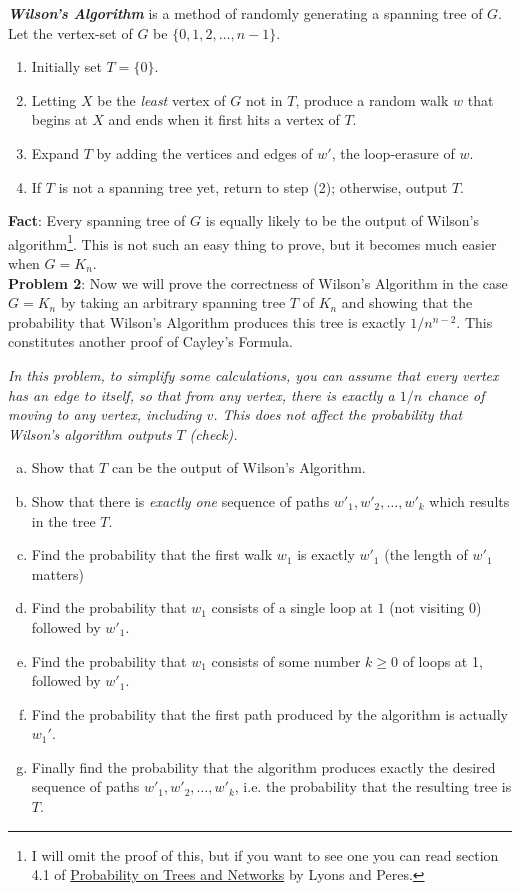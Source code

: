 \documentclass{amsart}
\begin{document}
	\noindent \textit{\textbf{Wilson's Algorithm}} is a method of randomly generating a spanning tree of $G$. Let the vertex-set of $G$ be $\{0,1,2,\dots,n-1\}$.
	\begin{enumerate}[(1)]
		\item Initially set $T = \{0\}$.
		\item Letting $X$ be the \textit{least} vertex of $G$ not in $T$, produce a random walk $w$ that begins at $X$ and ends when it first hits a vertex of $T$.
		\item Expand $T$ by adding the vertices and edges of $w'$, the loop-erasure of $w$.
		\item If $T$ is not a spanning tree yet, return to step (2); otherwise, output $T$.\\
	\end{enumerate}
	\textbf{Fact}: Every spanning tree of $G$ is equally likely to be the output of Wilson's algorithm\footnote{I will omit the proof of this, but if you want to see one you can read section 4.1 of \href{https://rdlyons.pages.iu.edu/prbtree/book_pb.pdf}{Probability on Trees and Networks} by Lyons and Peres.}. This is not such an easy thing to prove, but it becomes much easier when $G=K_n$.\\
	
	\noindent \textbf{Problem 2}: Now we will prove the correctness of Wilson's Algorithm in the case $G=K_n$ by taking an arbitrary spanning tree $T$ of $K_n$ and showing that the probability that Wilson's Algorithm produces this tree is exactly $1/n^{n-2}$. This constitutes another proof of Cayley's Formula.
	
	\textit{In this problem, to simplify some calculations, you can assume that every vertex has an edge to itself, so that from any vertex, there is exactly a $1/n$ chance of moving to any vertex, including $v$. This does not affect the probability that Wilson's algorithm outputs $T$ (check).}
	
	\begin{enumerate}[(a)]
		\item Show that $T$ can be the output of Wilson's Algorithm.
		\item Show that there is \textit{exactly one} sequence of paths $w'_1,w'_2,\dots,w'_k$ which results in the tree $T$.
		\item Find the probability that the first walk $w_1$ is exactly $w'_1$ (the length of $w'_1$ matters)
		\item Find the probability that $w_1$ consists of a single loop at $1$ (not visiting $0$) followed by $w'_1$. 
		\item Find the probability that $w_1$ consists of some number $k\geq 0$ of loops at 1, followed by $w'_1$.
		\item Find the probability that the first path produced by the algorithm is actually $w_1'$.
		\item Finally find the probability that the algorithm produces exactly the desired sequence of paths $w'_1,w'_2,\dots,w'_k$, i.e. the probability that the resulting tree is $T$.
	\end{enumerate}
	
\end{document}

